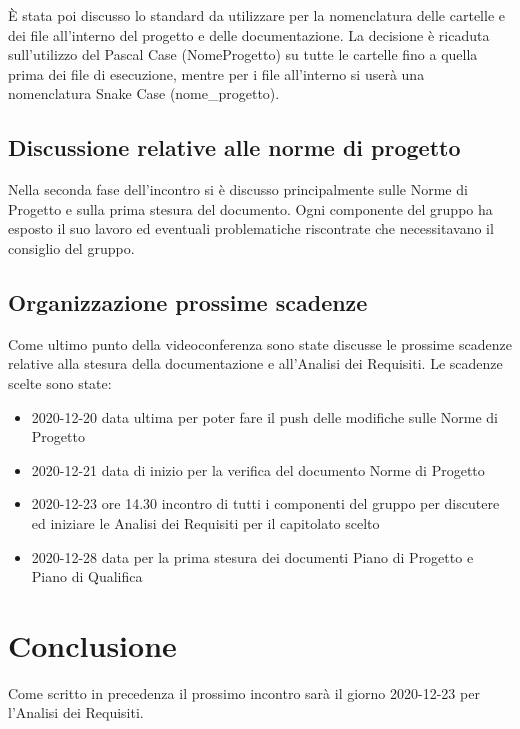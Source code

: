 È stata poi discusso lo standard da utilizzare per la nomenclatura delle cartelle e dei file all'interno del progetto e delle documentazione. La decisione è ricaduta sull'utilizzo del Pascal Case (NomeProgetto) su tutte le cartelle fino a quella prima dei file di esecuzione, mentre per i file all'interno si userà una nomenclatura Snake Case (nome\_progetto).

\subsection{Discussione relative alle norme di progetto}
Nella seconda fase dell'incontro si è discusso principalmente sulle Norme di Progetto e sulla prima stesura del documento. Ogni componente del gruppo ha esposto il suo lavoro ed eventuali problematiche riscontrate che necessitavano il consiglio del gruppo. 

\subsection{Organizzazione prossime scadenze}
Come ultimo punto della videoconferenza sono state discusse le prossime scadenze relative alla stesura della documentazione e all'Analisi dei Requisiti. Le scadenze scelte sono state:
\begin{itemize}
	\item 2020-12-20 data ultima per poter fare il push delle modifiche sulle Norme di Progetto
	\item 2020-12-21 data di inizio per la verifica del documento Norme di Progetto 
	\item 2020-12-23 ore 14.30 incontro di tutti i componenti del gruppo per discutere ed iniziare le Analisi dei Requisiti per il capitolato scelto
	\item 2020-12-28 data per la prima stesura dei documenti Piano di Progetto e Piano di Qualifica
\end{itemize}

\section{Conclusione}
Come scritto in precedenza il prossimo incontro sarà il giorno 2020-12-23 per l'Analisi dei Requisiti.

